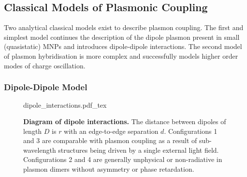 \documentclass{article}
\begin{document}
\subsection{Classical Models of Plasmonic Coupling}

Two analytical classical models exist to describe plasmon coupling. The first and simplest model continues the description of the dipole plasmon present in small (quasistatic) MNPs and introduces dipole-dipole interactions. The second model of plasmon hybridisation is more complex and successfully models higher order modes of charge oscillation.

\subsubsection{Dipole-Dipole Model}

\begin{figure}[bt]
\fontsize{10pt}{1em}\selectfont
\def\svgwidth{0.7\textwidth}
{dipole_interactions.pdf_tex}
\caption[Diagram of dipole interactions]{\textbf{Diagram of dipole interactions.} The distance between dipoles of length $D$ is $r$ with an edge-to-edge separation $d$. Configurations 1 and 3 are comparable with plasmon coupling as a result of sub-wavelength structures being driven by a single external light field. Configurations 2 and 4 are generally unphysical or non-radiative in plasmon dimers without asymmetry or phase retardation.}
\label{fig:dipole_interactions}
\end{figure}
\end{document}
